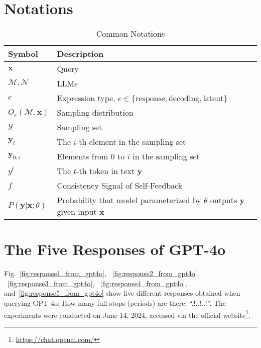 \section{Notations} \label{apdx:notation}

\begin{table}[h!]
\caption{Common Notations} \label{tab:symbols}
\centering
\begin{tabular}{p{1.2cm}p{6.5cm}}
\toprule
Symbol & Description \\ 
\midrule
$\boldsymbol{x}$ & Query \\ 
$\mathcal{M}, \mathcal{N}$ & LLMs \\ 
$e$ & Expression type, $e \in \{\text{response}, \text{decoding},\text{latent}\}$ \\
$O_e(\mathcal{M}, \boldsymbol{x})$ & Sampling distribution \\
$\mathcal{Y}$ & Sampling set \\ 
$\boldsymbol{y}_i$ & The $i$-th element in the sampling set \\ 
$\boldsymbol{y}_{0:i}$ & Elements from $0$ to $i$ in the sampling set \\ 
$y^t$ & The $t$-th token in text $\boldsymbol{y}$ \\ 
$f$ & Consistency Signal of Self-Feedback \\ 
$P(\boldsymbol{y}|\boldsymbol{x};\theta)$ & Probability that model parameterized by $\theta$ outputs $\boldsymbol{y}$ given input $\boldsymbol{x}$ \\ 
\bottomrule
\end{tabular}
\end{table}

\section{The Five Responses of GPT-4o} \label{apdx:GPT4o}

\noindent Fig.~\ref{fig:response1_from_gpt4o}, ~\ref{fig:response2_from_gpt4o}, ~\ref{fig:response3_from_gpt4o}, ~\ref{fig:response4_from_gpt4o}, and~\ref{fig:response5_from_gpt4o} show five different responses obtained when querying GPT-4o: How many full stops (periods) are there: ``.!..!..!''. The experiments were conducted on June 14, 2024, accessed via the official website\footnote{\url{https://chat.openai.com/}}.

